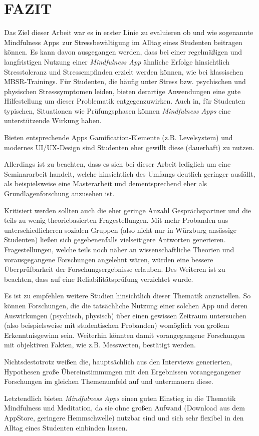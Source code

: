 \documentclass[10pt]{article}
\begin{document}
\section{FAZIT}
Das Ziel dieser Arbeit war  es in erster Linie zu evaluieren ob und wie sogenannte \grqq Mindfulness Apps\grqq\ zur Stressbewältigung im Alltag eines Studenten beitragen können. 
Es kann davon ausgegangen werden, dass bei einer regelmäßigen und langfristigen Nutzung einer \textit{Mindfulness App} ähnliche Erfolge hinsichtlich Stresstoleranz und Stressempfinden erzielt werden können, wie bei klassischen MBSR-Trainings. 
Für Studenten, die häufig unter Stress bzw. psychischen und physischen Stresssymptomen leiden, bieten derartige Anwendungen eine gute Hilfestellung um dieser Problematik entgegenzuwirken.
Auch in, für Studenten typischen, Situationen wie Prüfungsphasen können \textit{Mindfulness Apps} eine unterstützende Wirkung haben.

Bieten entsprechende Apps Gamification-Elemente (z.B. Levelsystem) und modernes UI/UX-Design sind Studenten eher gewillt diese (dauerhaft) zu nutzen.

Allerdings ist zu beachten, dass es sich bei dieser Arbeit lediglich um eine Seminararbeit handelt, welche hinsichtlich des Umfangs deutlich geringer ausfällt, als beispielsweise eine Masterarbeit und dementsprechend eher als Grundlagenforschung anzusehen ist. 

Kritisiert werden sollten auch die eher geringe Anzahl Gesprächspartner und die teils zu wenig theoriebasierten  Fragestellungen. Mit mehr Probanden aus unterschiedlicheren sozialen Gruppen (also nicht nur in Würzburg ansässige Studenten) ließen sich gegebenenfalls vielseitigere Antworten generieren. Fragestellungen, welche teils noch näher an wissenschaftliche Theorien und vorausgegangene Forschungen angelehnt wären, würden eine bessere Überprüfbarkeit der Forschungsergebnisse erlauben. Des Weiteren ist zu beachten, dass auf eine Reliabilitätsprüfung verzichtet wurde.

Es ist zu empfehlen weitere Studien hinsichtlich dieser Thematik anzustellen. So können Forschungen, die die tatsächliche Nutzung einer solchen App und deren Auswirkungen (psychisch, physisch) über einen gewissen Zeitraum untersuchen (also beispielsweise mit studentischen Probanden) womöglich von großem Erkenntnisgewinn sein. Weiterhin könnten damit vorangegangene Forschungen mit objektiven Fakten, wie z.B. Messwerten, bestätigt werden.

Nichtsdestotrotz weißen die, hauptsächlich aus den Interviews generierten, Hypothesen große Übereinstimmungen mit den Ergebnissen vorangegangener Forschungen im gleichen Themenumfeld auf und untermauern diese.

Letztendlich bieten \textit{Mindfulness Apps} einen guten Einstieg in die Thematik Mindfulness und Meditation, da sie ohne großen Aufwand (Download aus dem AppStore, geringere Hemmschwelle) nutzbar sind und sich sehr flexibel in den Alltag eines Studenten einbinden lassen. 
\nocite{*}
\printbibliography
\end{document}

